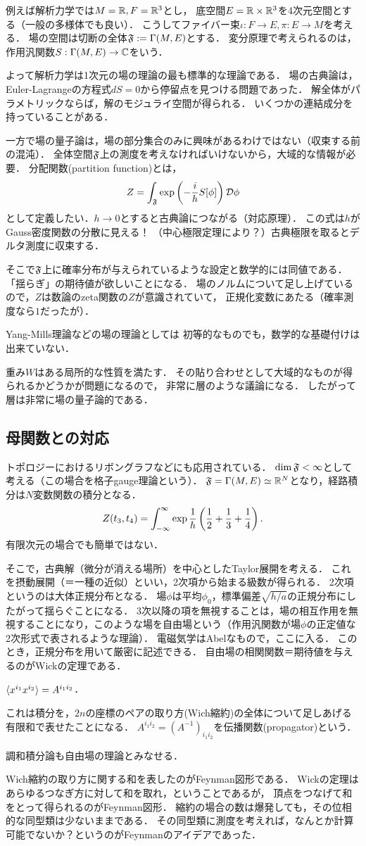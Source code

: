 \documentclass[uplatex,dvipdfmx]{jsreport}
\begin{document}
例えば解析力学では$M=\mathbb{R},F=\mathbb{R}^3$とし，
底空間$E=\mathbb{R}\times\mathbb{R}^3$を4次元空間とする（一般の多様体でも良い）．
こうしてファイバー束$\iota:F\to E,\pi:E\to M$を考える．
場の空間は切断の全体$\mathfrak{F}:=\Gamma(M,E)$とする．
変分原理で考えられるのは，作用汎関数$S:\Gamma(M,E)\to\mathbb{C}$をいう．

よって解析力学は1次元の場の理論の最も標準的な理論である．
場の古典論は，Euler-Lagrangeの方程式$dS=0$から停留点を見つける問題であった．
解全体がパラメトリックならば，解のモジュライ空間が得られる．
いくつかの連結成分を持っていることがある．

一方で場の量子論は，場の部分集合のみに興味があるわけではない（収束する前の混沌）．
全体空間$\mathfrak{F}$上の測度を考えなければいけないから，大域的な情報が必要．
分配関数(partition function)とは，
\[Z=\int_{\mathfrak{F}}\exp\left(-\frac{i}{h}S[\phi]\right)\mathcal{D}\phi\]
として定義したい．$h\to0$とすると古典論につながる（対応原理）．
この式は$h$がGauss密度関数の分散に見える！
（中心極限定理により？）古典極限を取るとデルタ測度に収束する．

そこで$\mathfrak{F}$上に確率分布が与えられているような設定と数学的には同値である．
「揺らぎ」の期待値が欲しいことになる．
場のノルムについて足し上げているので，$Z$は数論のzeta関数の$Z$が意識されていて，
正規化変数にあたる（確率測度なら$1$だったが）．

Yang-Mills理論などの場の理論としては
初等的なものでも，数学的な基礎付けは出来ていない．

重み$W$はある局所的な性質を満たす．
その貼り合わせとして大域的なものが得られるかどうかが問題になるので，
非常に層のような議論になる．
したがって層は非常に場の量子論的である．

\subsection{母関数との対応}

トポロジーにおけるリボングラフなどにも応用されている．
$\dim\mathfrak{F}<\infty$として考える（この場合を格子gauge理論という）．
$\mathfrak{F}=\Gamma(M,E)\simeq\mathbb{R}^N$となり，経路積分は$N$変数関数の積分となる．
\[Z(t_3,t_4)=\int^\infty_{-\infty}\exp\frac{1}{h}\left(\frac{1}{2}+\frac{1}{3}+\frac{1}{4}\right).\]
有限次元の場合でも簡単ではない．

そこで，古典解（微分が消える場所）を中心としたTaylor展開を考える．
これを摂動展開（＝一種の近似）といい，2次項から始まる級数が得られる．
2次項というのは大体正規分布となる．
場$\phi$は平均$\phi_0$，標準偏差$\sqrt{h/a}$の正規分布にしたがって揺らぐことになる．
3次以降の項を無視することは，場の相互作用を無視することになり，このような場を自由場という（作用汎関数が場$\phi$の正定値な2次形式で表されるような理論）．
電磁気学はAbelなもので，ここに入る．
このとき，正規分布を用いて厳密に記述できる．
自由場の相関関数＝期待値を与えるのがWickの定理である．
\begin{theorem}[Wick]
    $\langle x^{i_1}x^{i_2}\rangle=A^{i_1i_2}$．
\end{theorem}
これは積分を，$2n$の座標のペアの取り方(Wich縮約)の全体について足しあげる有限和で表せたことになる．
$A^{i_1i_2}=(A^{-1})_{i_1i_2}$を伝播関数(propagator)という．

調和積分論も自由場の理論とみなせる．

Wich縮約の取り方に関する和を表したのがFeynman図形である．
Wickの定理はあらゆるつなぎ方に対して和を取れ，ということであるが，
頂点をつなげて和をとって得られるのがFeynman図形．
縮約の場合の数は爆発しても，その位相的な同型類は少ないままである．
その同型類に測度を考えれば，なんとか計算可能でないか？というのがFeynmanのアイデアであった．
\end{document}
